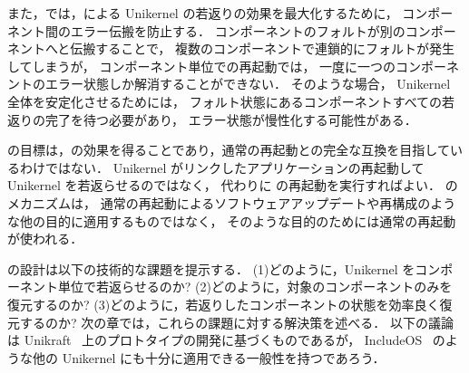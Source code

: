 また，\sysname では，\rr による Unikernel の若返りの効果を最大化するために，
コンポーネント間のエラー伝搬を防止する．
コンポーネントのフォルトが別のコンポーネントへと伝搬することで，
複数のコンポーネントで連鎖的にフォルトが発生してしまうが，
コンポーネント単位での再起動では，
一度に一つのコンポーネントのエラー状態しか解消することができない．
そのような場合，
Unikernel 全体を安定化させるためには，
フォルト状態にあるコンポーネントすべての若返りの完了を待つ必要があり，
エラー状態が慢性化する可能性がある．

\sysname の目標は，\rr の効果を得ることであり，通常の再起動との完全な互換を目指しているわけではない．
Unikernel がリンクしたアプリケーションの再起動して Unikernel を若返らせるのではなく，
代わりに \sysname の再起動を実行すればよい．
\sysname のメカニズムは，
通常の再起動によるソフトウェアアップデートや再構成のような他の目的に適用するものではなく，
そのような目的のためには通常の再起動が使われる．

\sysname の設計は以下の技術的な課題を提示する．
(1)どのように，Unikernel をコンポーネント単位で若返らせるのか?
(2)どのように，対象のコンポーネントのみを復元するのか?
(3)どのように，若返りしたコンポーネントの状態を効率良く復元するのか?
次の章では，これらの課題に対する解決策を述べる．
以下の議論は Unikraft~\cite{KuenzerEtAl-Unikraft} 上のプロトタイプの開発に基づくものであるが，
IncludeOS~\cite{BratterudEtAl-IncludeOS} のような他の Unikernel にも十分に適用できる一般性を持つであろう．
